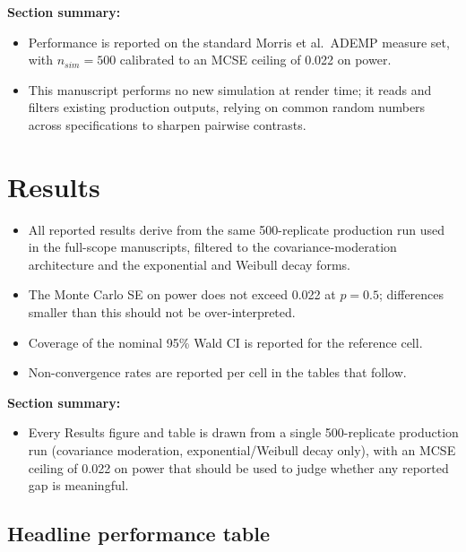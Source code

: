 \documentclass[
  11pt,
]{article}
\providecommand{\tightlist}{%
  \setlength{\itemsep}{0pt}\setlength{\parskip}{0pt}}
\begin{document}
\textbf{Section summary:}

\begin{itemize}
\tightlist
\item
  Performance is reported on the standard Morris et al.~ADEMP measure
  set, with \(n_{sim}=500\) calibrated to an MCSE ceiling of 0.022 on
  power.
\item
  This manuscript performs no new simulation at render time; it reads
  and filters existing production outputs, relying on common random
  numbers across specifications to sharpen pairwise contrasts.
\end{itemize}

\section{Results}\label{results}

\begin{itemize}
\tightlist
\item
  All reported results derive from the same 500-replicate production
  run used in the full-scope manuscripts, filtered to the
  covariance-moderation architecture and the exponential and Weibull
  decay forms.
\item
  The Monte Carlo SE on power does not exceed 0.022 at \(p = 0.5\);
  differences smaller than this should not be over-interpreted.
\item
  Coverage of the nominal 95\% Wald CI is reported for the reference
  cell.
\item
  Non-convergence rates are reported per cell in the tables that
  follow.
\end{itemize}

\textbf{Section summary:}

\begin{itemize}
\tightlist
\item
  Every Results figure and table is drawn from a single 500-replicate
  production run (covariance moderation, exponential/Weibull decay
  only), with an MCSE ceiling of 0.022 on power that should be used
  to judge whether any reported gap is meaningful.
\end{itemize}

\subsection{Headline performance table}\label{sec-headline}
\end{document}
